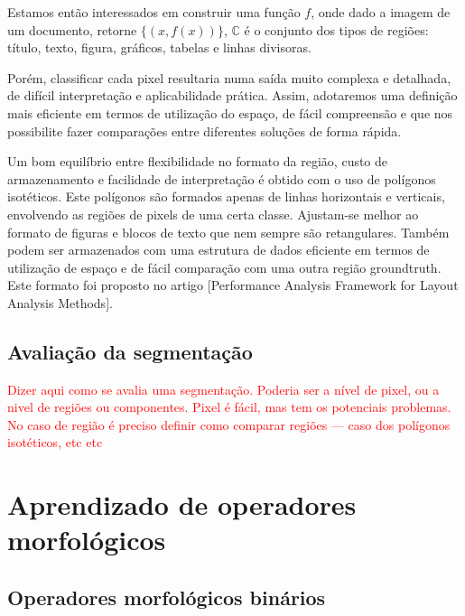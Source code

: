 \documentclass[a4paper,11pt]{article}
\newcommand{\TODO}[1]{\textcolor{red}{#1}}
\begin{document}

    Estamos então interessados em construir uma função $f$, onde dado
    a imagem de um documento, retorne $\lbrace (x, f(x)) \rbrace$,
    $\mathbb{C}$ é o conjunto dos tipos de regiões: título, texto,
    figura, gráficos, tabelas e linhas divisoras.

    Porém, classificar cada pixel resultaria numa saída muito complexa
    e detalhada, de difícil interpretação e aplicabilidade
    prática. Assim, adotaremos uma definição mais eficiente em termos
    de utilização do espaço, de fácil compreensão e que nos
    possibilite fazer comparações entre diferentes soluções de forma
    rápida.


    Um bom equilíbrio entre flexibilidade no formato da região, custo
    de armazenamento e facilidade de interpretação é obtido com o uso
    de polígonos isotéticos. Este polígonos são formados apenas de
    linhas horizontais e verticais, envolvendo as regiões de pixels de
    uma certa classe. Ajustam-se melhor ao formato de figuras e blocos
    de texto que nem sempre são retangulares. Também podem ser
    armazenados com uma estrutura de dados eficiente em termos de
    utilização de espaço e de fácil comparação com uma outra região
    groundtruth. Este formato foi proposto no artigo [Performance
      Analysis Framework for Layout Analysis Methods].


\subsection{Avaliação da segmentação}

\TODO{Dizer aqui como se avalia uma segmentação. Poderia ser a nível
  de pixel, ou a nivel de regiões ou componentes. Pixel é fácil, mas
  tem os potenciais problemas. No caso de região é preciso definir
  como comparar regiões --- caso dos polígonos isotéticos, etc etc}






\section{Aprendizado de operadores morfológicos}

\subsection{Operadores morfológicos binários}
\end{document}
